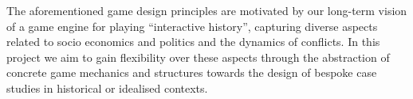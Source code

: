 \documentclass[11pt]{article}
\begin{document}

The aforementioned game design principles are motivated by our long-term vision of a game engine for playing
``interactive history'', capturing diverse aspects related to socio economics and politics and the dynamics
of conflicts.  In this project we aim to gain flexibility over these aspects through the abstraction of
concrete game mechanics and structures towards the design of bespoke case studies in historical or idealised
contexts.

\end{document}
